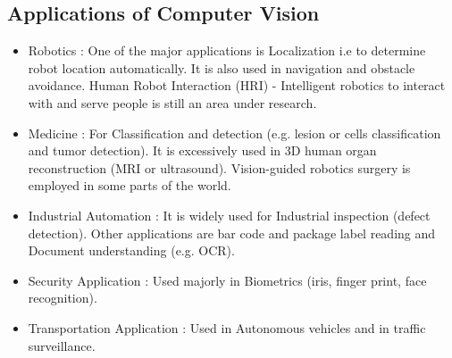 \documentclass[12pt, a4paper]{article}
\begin{document}
\begin{large}\subsection{Applications of Computer Vision}\end{large}
\hspace{3cm}
\begin{itemize}
\item Robotics : One of the major applications is Localization i.e to determine robot location automatically. It is also used in navigation and obstacle avoidance. Human Robot Interaction (HRI) - Intelligent robotics to interact with and serve people is still an area under research.

\item Medicine : For Classification and detection (e.g. lesion or cells classification and tumor detection). It is excessively used in 3D human organ reconstruction (MRI or ultrasound). Vision-guided robotics surgery is employed in some parts of the world.

\item Industrial Automation : It is widely used for Industrial inspection (defect detection). Other applications are bar code and package label reading and Document understanding (e.g. OCR).

\item Security Application : Used majorly in Biometrics (iris, finger print, face recognition).

\item Transportation Application : Used in Autonomous vehicles and in traffic surveillance.

\end{itemize}
\end{document}
